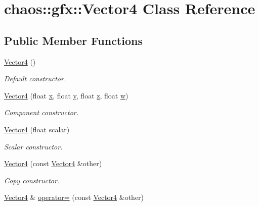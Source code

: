 \hypertarget{classchaos_1_1gfx_1_1_vector4}{\section{chaos\-:\-:gfx\-:\-:Vector4 Class Reference}
\label{classchaos_1_1gfx_1_1_vector4}
}
\subsection*{Public Member Functions}
\begin{DoxyCompactItemize}
\item 
\hyperlink{classchaos_1_1gfx_1_1_vector4_abdee87e0c5bbd7a9870957951f2bba80}{Vector4} ()
\begin{DoxyCompactList}\small\item\em Default constructor. \end{DoxyCompactList}\item 
\hyperlink{classchaos_1_1gfx_1_1_vector4_a8e22c6ae7ba175d15bd8804cff77519e}{Vector4} (float \hyperlink{classchaos_1_1gfx_1_1_vector4_a74f8e26ec8f6c55a11ed5a423fb0eec4}{x}, float \hyperlink{classchaos_1_1gfx_1_1_vector4_aa823679c8ce9d8b882f7e05f5670ee74}{y}, float \hyperlink{classchaos_1_1gfx_1_1_vector4_ae1e282cb0c262db6c20f29c34d727938}{z}, float \hyperlink{classchaos_1_1gfx_1_1_vector4_a3cd40a2e6ce1fd10a0d2c8136965e9dd}{w})
\begin{DoxyCompactList}\small\item\em Component constructor. \end{DoxyCompactList}\item 
\hyperlink{classchaos_1_1gfx_1_1_vector4_aa2630f2dfef3d7a9ae5b284be502f528}{Vector4} (float scalar)
\begin{DoxyCompactList}\small\item\em Scalar constructor. \end{DoxyCompactList}\item 
\hyperlink{classchaos_1_1gfx_1_1_vector4_aabd97977b6470d2e03ab15d7fe5e0678}{Vector4} (const \hyperlink{classchaos_1_1gfx_1_1_vector4}{Vector4} \&other)
\begin{DoxyCompactList}\small\item\em Copy constructor. \end{DoxyCompactList}\item 
\hyperlink{classchaos_1_1gfx_1_1_vector4}{Vector4} \& \hyperlink{classchaos_1_1gfx_1_1_vector4_ad6b4eb3482cb75173ca23edd9f352930}{operator=} (const \hyperlink{classchaos_1_1gfx_1_1_vector4}{Vector4} \&other)

\end{DoxyCompactItemize}
